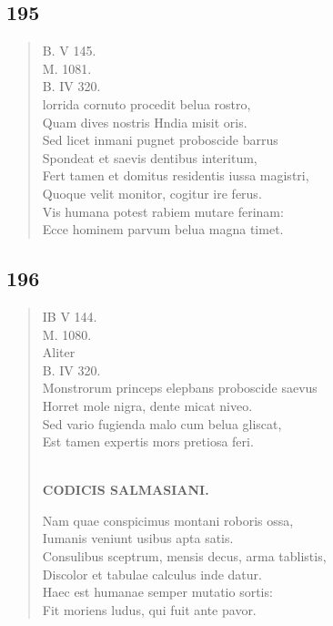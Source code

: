 \documentclass[11pt, a4paper]{report}
\begin{document}
            \subsection*{195}
      \begin{verse}
      B. V 145. \\ M. 1081. \\ B. IV 320. \\ lorrida cornuto procedit belua rostro, \\ Quam dives nostris Hndia misit oris. \\ Sed licet inmani pugnet proboscide barrus \\ Spondeat et saevis dentibus interitum, \\ Fert tamen et domitus residentis iussa magistri, \\ Quoque velit monitor, cogitur ire ferus. \\ Vis humana potest rabiem mutare ferinam: \\ Ecce hominem parvum belua magna timet. \\ 
      \end{verse}
  
            \subsection*{196}
      \begin{verse}
      IB V 144. \\ M. 1080. \\ Aliter \\ B. IV 320. \\ Monstrorum princeps elepbans proboscide saevus \\ Horret mole nigra, dente micat niveo. \\ Sed vario fugienda malo cum belua gliscat, \\ Est tamen expertis mors pretiosa feri. \\ 
        ﻿\pagebreak 
    \begin{center} \textbf{CODICIS SALMASIANI.} \end{center} \marginpar{[161]} Nam quae conspicimus montani roboris ossa, \\ Iumanis veniunt usibus apta satis. \\ Consulibus sceptrum, mensis decus, arma tablistis, \\ Discolor et tabulae calculus inde datur. \\ Haec est humanae semper mutatio sortis: \\ Fit moriens ludus, qui fuit ante pavor. \\ 
      \end{verse}
  
\end{document}
